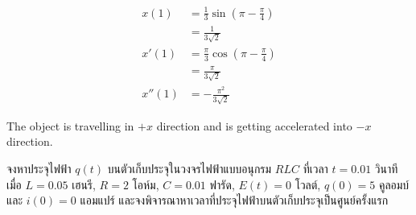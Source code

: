 \documentclass[12pt,final]{novelette} %
\begin{document}
\begin{question}[resume]
\begin{question}
        \phantom{}
        \vspace*{-1em}
        \begin{align*}
            x(1)   & = \frac13 \sin\left(\pi - \frac\pi4\right)   \\
                   & = \boxed{\frac1{3\sqrt2}}                    \\
            x'(1)  & = \frac\pi3 \cos\left(\pi - \frac\pi4\right) \\
                   & = \boxed{\frac{\pi}{3\sqrt2}}                \\
            x''(1) & = \boxed{-\frac{\pi^2}{3\sqrt2}}
        \end{align*}

        The object is travelling in $+x$ direction and is getting accelerated into $-x$ direction.
    \end{question}

    \item {}
    จงหาประจุไฟฟ้า $q(t)$ บนตัวเก็บประจุในวงจรไฟฟ้าแบบอนุกรม $RLC$ ที่เวลา $t = 0.01$ วินาที \\
    เมื่อ $L = 0.05$ เฮนรี, $R = 2$ โอห์ม, $C = 0.01$ ฟารัด, $E(t) = 0$ โวลต์, $q(0) = 5$ คูลอมบ์ และ $i(0) = 0$ แอมแปร์
    และจงพิจารณาหาเวลาที่ประจุไฟฟ้าบนตัวเก็บประจุเป็นศูนย์ครั้งแรก 


\end{question}
\end{document}
